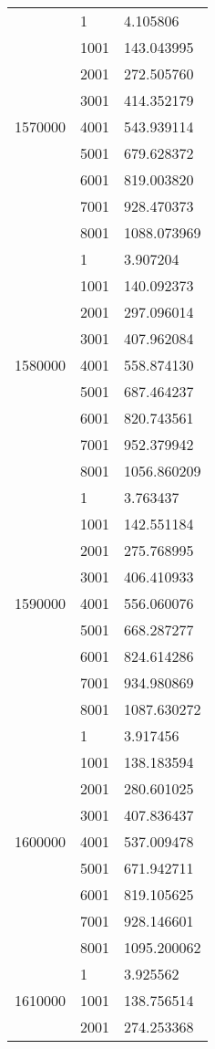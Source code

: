 \begin{table}[htb!]
\begin{tabular}{lll}
\multirow[c]{9}{*}{1570000} & 1 & 4.105806 \\
 & 1001 & 143.043995 \\
 & 2001 & 272.505760 \\
 & 3001 & 414.352179 \\
 & 4001 & 543.939114 \\
 & 5001 & 679.628372 \\
 & 6001 & 819.003820 \\
 & 7001 & 928.470373 \\
 & 8001 & 1088.073969 \\
\multirow[c]{9}{*}{1580000} & 1 & 3.907204 \\
 & 1001 & 140.092373 \\
 & 2001 & 297.096014 \\
 & 3001 & 407.962084 \\
 & 4001 & 558.874130 \\
 & 5001 & 687.464237 \\
 & 6001 & 820.743561 \\
 & 7001 & 952.379942 \\
 & 8001 & 1056.860209 \\
\multirow[c]{9}{*}{1590000} & 1 & 3.763437 \\
 & 1001 & 142.551184 \\
 & 2001 & 275.768995 \\
 & 3001 & 406.410933 \\
 & 4001 & 556.060076 \\
 & 5001 & 668.287277 \\
 & 6001 & 824.614286 \\
 & 7001 & 934.980869 \\
 & 8001 & 1087.630272 \\
\multirow[c]{9}{*}{1600000} & 1 & 3.917456 \\
 & 1001 & 138.183594 \\
 & 2001 & 280.601025 \\
 & 3001 & 407.836437 \\
 & 4001 & 537.009478 \\
 & 5001 & 671.942711 \\
 & 6001 & 819.105625 \\
 & 7001 & 928.146601 \\
 & 8001 & 1095.200062 \\
\multirow[c]{9}{*}{1610000} & 1 & 3.925562 \\
 & 1001 & 138.756514 \\
 & 2001 & 274.253368 \\

\end{tabular}
\end{table}
